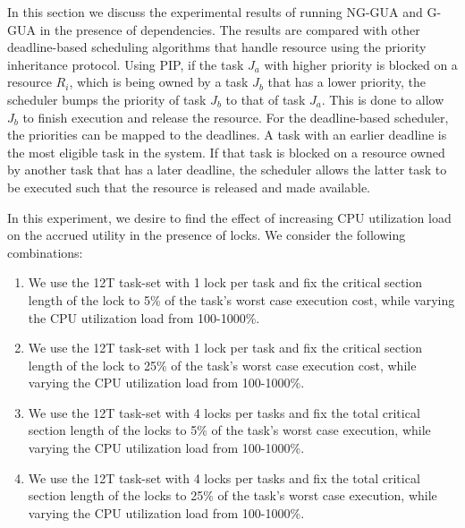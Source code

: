 \documentclass[12pt,dvips]{report}
\begin{document}
In this section we discuss the experimental results of running NG-GUA and G-GUA in the presence of dependencies. The results are compared with other deadline-based scheduling algorithms that handle resource using the priority inheritance protocol. Using PIP, if the task $J_a$ with higher priority is blocked on a resource $R_i$, which is being owned by a task $J_b$ that has a lower priority, the scheduler bumps the priority of task $J_b$ to that of task $J_a$. This is done to allow $J_b$ to finish execution and release the resource. For the deadline-based scheduler, the priorities can be mapped to the deadlines. A task with an earlier deadline is the most eligible task in the system. If that task is blocked on a resource owned by another task that has a later deadline, the scheduler allows the latter task to be executed such that the resource is released and made available.

In this experiment, we desire to find the effect of increasing CPU utilization load on the accrued utility in the presence of locks. We consider the following combinations:

\begin{enumerate}
\item We use the 12T task-set with 1 lock per task and fix the critical section length of the lock to 5\% of the task's worst case execution cost, while varying the CPU utilization load from 100-1000\%.
\item We use the 12T task-set with 1 lock per task and fix the critical section length of the lock to 25\% of the task's worst case execution cost, while varying the CPU utilization load from 100-1000\%.
\item We use the 12T task-set with 4 locks per tasks and fix the total critical section length of the locks to 5\% of the task's worst case execution, while varying the CPU utilization load from 100-1000\%.
\item We use the 12T task-set with 4 locks per tasks and fix the total critical section length of the locks to 25\% of the task's worst case execution, while varying the CPU utilization load from 100-1000\%.
\end{enumerate}
\end{document}
